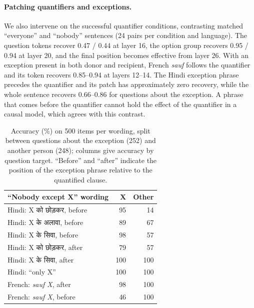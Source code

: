 \documentclass[11pt]{article}
\newcommand{\hi}[1]{{\hindifont #1}}
\begin{document}
\paragraph{Patching quantifiers and exceptions.} We also intervene on the successful quantifier conditions, contrasting matched ``everyone'' and ``nobody'' sentences (24 pairs per condition and language). The question tokens recover 0.47 / 0.44 at layer 16, the option group recovers 0.95 / 0.94 at layer 20, and the final position becomes effective from layer 26. With an exception present in both donor and recipient, French \emph{sauf} follows the quantifier and its token recovers 0.85--0.94 at layers 12--14. The Hindi exception phrase precedes the quantifier and its patch has approximately zero recovery, while the whole sentence recovers 0.66--0.86 for questions about the exception. A phrase that comes before the quantifier cannot hold the effect of the quantifier in a causal model, which agrees with this contrast.

\begin{table}[t]
\small\centering
\begin{tabularx}{\linewidth}{@{}Xrr@{}}
\toprule
``Nobody except X'' wording & X & Other \\
\midrule
Hindi: X \hi{को छोड़कर}, before & 95 & 14 \\
Hindi: X \hi{के अलावा}, before & 89 & 67 \\
Hindi: X \hi{के सिवा}, before & 98 & 57 \\
Hindi: X \hi{को छोड़कर}, after & 79 & 57 \\
Hindi: X \hi{के सिवा}, after & 100 & 100 \\
Hindi: ``only X'' & 100 & 100 \\
French: \emph{sauf X}, after & 98 & 100 \\
French: \emph{sauf X}, before & 46 & 100 \\
\bottomrule
\end{tabularx}
\caption{Accuracy (\%) on 500 items per wording, split between questions about the exception (252) and another person (248); columns give accuracy by question target. ``Before'' and ``after'' indicate the position of the exception phrase relative to the quantified clause.}
\label{tab:except}
\end{table}
\end{document}
